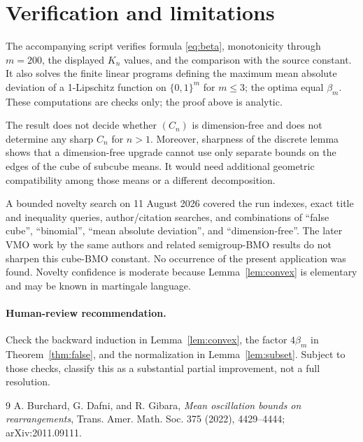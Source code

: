 \documentclass[11pt]{article}
\begin{document}
\section{Verification and limitations}

The accompanying script verifies formula \eqref{eq:beta}, monotonicity through
$m=200$, the displayed $K_n$ values, and the comparison with the source
constant.  It also solves the finite linear programs defining the maximum
mean absolute deviation of a 1-Lipschitz function on $\{0,1\}^m$ for
$m\le3$; the optima equal $\beta_m$.  These computations are checks only;
the proof above is analytic.

The result does not decide whether $(C_n)$ is dimension-free and does not
determine any sharp $C_n$ for $n>1$.  Moreover, sharpness of the discrete
lemma shows that a dimension-free upgrade cannot use only separate bounds on
the edges of the cube of subcube means.  It would need additional geometric
compatibility among those means or a different decomposition.

A bounded novelty search on 11 August 2026 covered the run indexes, exact
title and inequality queries, author/citation searches, and combinations of
``false cube'', ``binomial'', ``mean absolute deviation'', and
``dimension-free''.  The later VMO work by the same authors and related
semigroup-BMO results do not sharpen this cube-BMO constant.  No occurrence of
the present application was found.  Novelty confidence is moderate because
Lemma~\ref{lem:convex} is elementary and may be known in martingale language.

\paragraph{Human-review recommendation.}
Check the backward induction in Lemma~\ref{lem:convex}, the factor
$4\beta_m$ in Theorem~\ref{thm:false}, and the normalization in
Lemma~\ref{lem:subset}.  Subject to those checks, classify this as a
substantial partial improvement, not a full resolution.

\begin{thebibliography}{9}
A. Burchard, G. Dafni, and R. Gibara,
\emph{Mean oscillation bounds on rearrangements},
Trans. Amer. Math. Soc. 375 (2022), 4429--4444;
arXiv:2011.09111.
\end{thebibliography}
\end{document}
